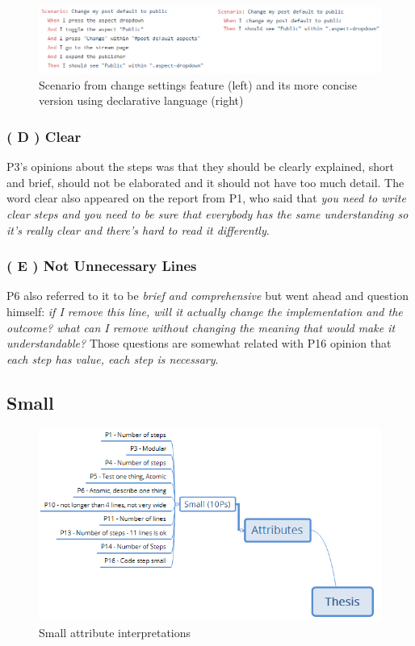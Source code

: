 \begin{figure}[t]
	\centering
	\includegraphics[scale=0.8]{images/change_settings_feature_concise_P15}
	\caption[Scenario's more concise version using declarative language]{Scenario from change settings feature (left) and its more concise version using declarative language (right)}
	\label{fig:concise_focused_declarative}
\end{figure}

\subsubsection{\textbf{( D ) Clear}}
P3's opinions about the steps was that they should be clearly explained, short and brief, should not be elaborated and it should not have too much detail. The word clear also appeared on the report from P1, who said that \textit{you need to write clear steps and you need to be sure that everybody has the same understanding so it's really clear and there's hard to read it differently}.

\subsubsection{\textbf{( E ) Not Unnecessary Lines}}
P6 also referred to it to be \textit{brief and comprehensive} but went ahead and question himself: \textit{if I remove this line, will it actually change the implementation and the outcome? what can I remove without changing the meaning that would make it understandable?} Those questions are somewhat related with P16 opinion that \textit{each step has value, each step is necessary}.

\subsection{Small}

\begin{figure}[t]
	\centering
	\includegraphics[scale=0.8]{images/small_attribute}
	\caption{Small attribute interpretations}
	\label{fig:small_attribute}
\end{figure}

